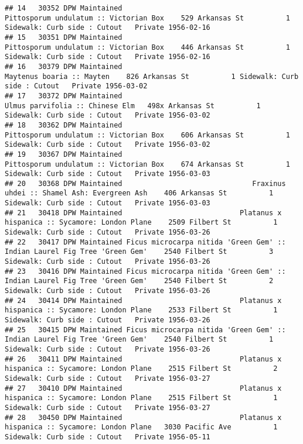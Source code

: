\documentclass[
]{article}
\begin{document}
\begin{verbatim}
## 14   30352 DPW Maintained                                    Pittosporum undulatum :: Victorian Box    529 Arkansas St          1 Sidewalk: Curb side : Cutout   Private 1956-02-16
## 15   30351 DPW Maintained                                    Pittosporum undulatum :: Victorian Box    446 Arkansas St          1 Sidewalk: Curb side : Cutout   Private 1956-02-16
## 16   30379 DPW Maintained                                                 Maytenus boaria :: Mayten    826 Arkansas St          1 Sidewalk: Curb side : Cutout   Private 1956-03-02
## 17   30372 DPW Maintained                                           Ulmus parvifolia :: Chinese Elm   498x Arkansas St          1 Sidewalk: Curb side : Cutout   Private 1956-03-02
## 18   30362 DPW Maintained                                    Pittosporum undulatum :: Victorian Box    606 Arkansas St          1 Sidewalk: Curb side : Cutout   Private 1956-03-02
## 19   30367 DPW Maintained                                    Pittosporum undulatum :: Victorian Box    674 Arkansas St          1 Sidewalk: Curb side : Cutout   Private 1956-03-03
## 20   30368 DPW Maintained                               Fraxinus uhdei :: Shamel Ash: Evergreen Ash    406 Arkansas St          1 Sidewalk: Curb side : Cutout   Private 1956-03-03
## 21   30418 DPW Maintained                            Platanus x hispanica :: Sycamore: London Plane    2509 Filbert St          1 Sidewalk: Curb side : Cutout   Private 1956-03-26
## 22   30417 DPW Maintained Ficus microcarpa nitida 'Green Gem' :: Indian Laurel Fig Tree 'Green Gem'    2540 Filbert St          3 Sidewalk: Curb side : Cutout   Private 1956-03-26
## 23   30416 DPW Maintained Ficus microcarpa nitida 'Green Gem' :: Indian Laurel Fig Tree 'Green Gem'    2540 Filbert St          2 Sidewalk: Curb side : Cutout   Private 1956-03-26
## 24   30414 DPW Maintained                            Platanus x hispanica :: Sycamore: London Plane    2533 Filbert St          1 Sidewalk: Curb side : Cutout   Private 1956-03-26
## 25   30415 DPW Maintained Ficus microcarpa nitida 'Green Gem' :: Indian Laurel Fig Tree 'Green Gem'    2540 Filbert St          1 Sidewalk: Curb side : Cutout   Private 1956-03-26
## 26   30411 DPW Maintained                            Platanus x hispanica :: Sycamore: London Plane    2515 Filbert St          2 Sidewalk: Curb side : Cutout   Private 1956-03-27
## 27   30410 DPW Maintained                            Platanus x hispanica :: Sycamore: London Plane    2515 Filbert St          1 Sidewalk: Curb side : Cutout   Private 1956-03-27
## 28   30450 DPW Maintained                            Platanus x hispanica :: Sycamore: London Plane   3030 Pacific Ave          1 Sidewalk: Curb side : Cutout   Private 1956-05-11

\end{verbatim}
\end{document}
